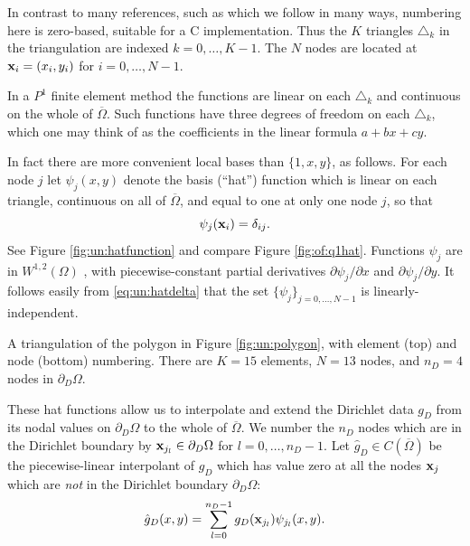 In contrast to many references, such as \citet{Elmanetal2005} which we follow in many ways, numbering here is zero-based, suitable for a C implementation.  Thus the $K$ triangles $\triangle_k$ in the triangulation are indexed $k=0,\dots,K-1$.  The $N$ nodes are located at $\mathbf{x}_i=(x_i,y_i)$ for $i=0,\dots,N-1$. 

In a $P^1$ finite element method the functions are linear on each $\triangle_k$ and continuous on the whole of $\overline\Omega$.  Such functions have three degrees of freedom on each $\triangle_k$, which one may think of as the coefficients in the linear formula $a + b x + c y$.

In fact there are more convenient local bases than $\{1,x,y\}$, as follows.  For each node $j$ let $\psi_j(x,y)$ denote the basis (``hat'') function which is linear on each triangle, continuous on all of $\overline{\Omega}$, and equal to one at only one node $j$, so that
\begin{equation}
\psi_j(\mathbf{x}_i) = \delta_{ij}.  \label{eq:un:hatdelta}
\end{equation}
See Figure \ref{fig:un:hatfunction} and compare Figure \ref{fig:of:q1hat}.  Functions $\psi_j$ are in $W^{1,2}(\Omega)$ \citep{Braess2007}, with piecewise-constant partial derivatives $\partial\psi_j/\partial x$ and $\partial\psi_j/\partial y$.  It follows easily from \eqref{eq:un:hatdelta} that the set $\{\psi_j\}_{j=0,\dots,N-1}$ is linearly-independent.

\begin{marginfigure}


\medskip


\caption{A triangulation of the polygon in Figure \ref{fig:un:polygon}, with element (top) and node (bottom) numbering.  There are $K=15$ elements, $N=13$ nodes, and $n_D=4$ nodes in $\partial_D\Omega$.}
\label{fig:un:number-mesh}
\end{marginfigure}

These hat functions allow us to interpolate and extend the Dirichlet data $g_D$ from its nodal values on $\partial_D \Omega$ to the whole of $\overline\Omega$.  We number the $n_D$ nodes which are in the Dirichlet boundary by $\mathbf{x}_{j_l} \in \partial_D\Omega$ for $l=0,\dots,n_D-1$.  Let $\hat g_D \in C(\overline\Omega)$ be the piecewise-linear interpolant of $g_D$ which has value zero at all the nodes $\mathbf{x}_j$ which are \emph{not} in the Dirichlet boundary $\partial_D \Omega$:
\begin{equation}
\hat g_D(x,y) = \sum_{l=0}^{n_D-1} g_D(\mathbf{x}_{j_l}) \psi_{j_l}(x,y). \label{eq:un:hatgdefine}
\end{equation}

